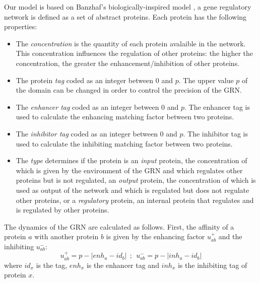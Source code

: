 Our model is based on Banzhaf's biologically-inspired model \cite{Banzhaf03}, a
gene regulatory network is defined as a set of abstract proteins. Each protein has the
following properties:
\begin{itemize}
\item The \emph{concentration} is the quantity of each protein avalaible in the network. This concentration influences the regulation of other proteins: the higher the concentration, the greater the enhancement/inhibition of other proteins.

\item The protein \emph{tag} coded as an integer between 0 and $p$. The
	upper value $p$ of the domain can be changed in order to control the
	precision of the GRN. 

\item The \emph{enhancer tag} coded as an integer between 0 and $p$. The
	enhancer tag is used to calculate the enhancing matching factor
	between two proteins.

\item The \emph{inhibitor tag} coded as an integer between 0 and $p$. The
	inhibitor tag is used to calculate the inhibiting matching factor
	between two proteins.

\item The \emph{type} determines if the protein is an \emph{input} protein, the
	concentration of which is given by the environment of the GRN and which
	regulates other proteins but is not regulated, an \emph{output} protein,
	the concentration of which is used as output of the network and which is
	regulated but does not regulate other proteins, or a \emph{regulatory}
	protein, an internal protein that regulates and is regulated by other
	proteins.

\end{itemize}

The dynamics of the GRN are calculated as follows. First, the affinity of a
protein $a$ with another protein $b$ is given by the enhancing factor
$u^{+}_{ab}$ and the inhibiting $u^{-}_{ab}$:
\begin{equation}
u^{+}_{ab}=p-|enh_a-id_b|~~;~~u^{-}_{ab}=p-|inh_a-id_b|
\end{equation}
where $id_x$ is the tag, $enh_x$ is the enhancer tag and $inh_x$
is the inhibiting tag of protein $x$.

